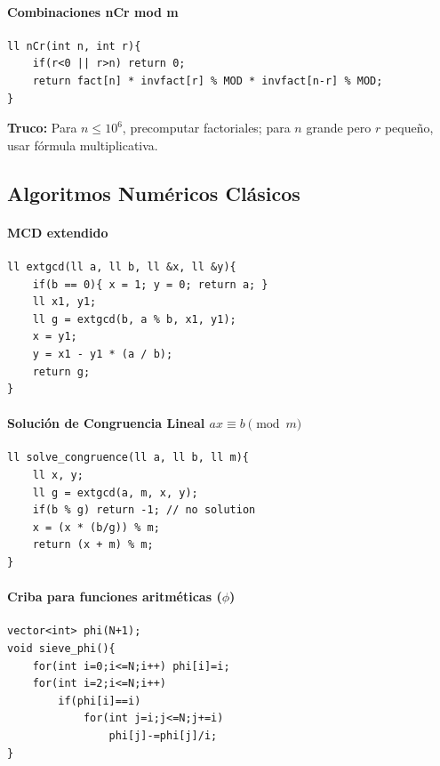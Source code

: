 \documentclass{article}
\begin{document}
\paragraph{Combinaciones nCr mod m}
\begin{lstlisting}[style=cppstyle]
ll nCr(int n, int r){
    if(r<0 || r>n) return 0;
    return fact[n] * invfact[r] % MOD * invfact[n-r] % MOD;
}
\end{lstlisting}

\textbf{Truco:}  
Para \(n \le 10^6\), precomputar factoriales; para \(n\) grande pero \(r\) pequeño, usar fórmula multiplicativa.


\subsection{Algoritmos Numéricos Clásicos}

\paragraph{MCD extendido}
\begin{lstlisting}[style=cppstyle]
ll extgcd(ll a, ll b, ll &x, ll &y){
    if(b == 0){ x = 1; y = 0; return a; }
    ll x1, y1;
    ll g = extgcd(b, a % b, x1, y1);
    x = y1;
    y = x1 - y1 * (a / b);
    return g;
}
\end{lstlisting}

\paragraph{Solución de Congruencia Lineal \(a x \equiv b \pmod{m}\)}
\begin{lstlisting}[style=cppstyle]
ll solve_congruence(ll a, ll b, ll m){
    ll x, y;
    ll g = extgcd(a, m, x, y);
    if(b % g) return -1; // no solution
    x = (x * (b/g)) % m;
    return (x + m) % m;
}
\end{lstlisting}

\paragraph{Criba para funciones aritméticas (\(\phi\))}
\begin{lstlisting}[style=cppstyle]
vector<int> phi(N+1);
void sieve_phi(){
    for(int i=0;i<=N;i++) phi[i]=i;
    for(int i=2;i<=N;i++)
        if(phi[i]==i)
            for(int j=i;j<=N;j+=i)
                phi[j]-=phi[j]/i;
}
\end{lstlisting}
\end{document}

